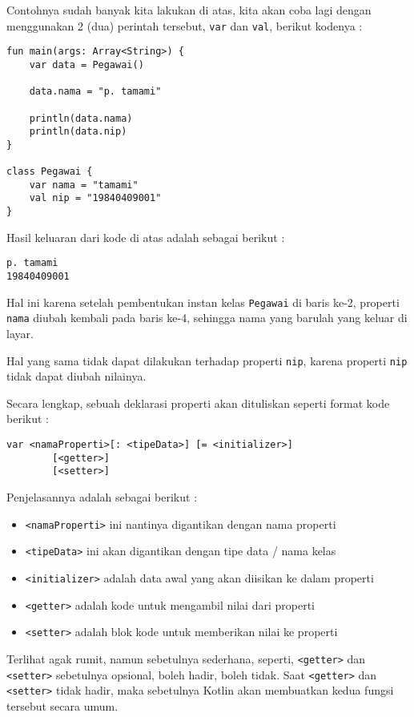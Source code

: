 Contohnya sudah banyak kita lakukan di atas, kita akan coba lagi dengan menggunakan 2 (dua) perintah tersebut, \texttt{var} dan \texttt{val}, berikut kodenya :

\begin{lstlisting}
fun main(args: Array<String>) {
	var data = Pegawai()
	
	data.nama = "p. tamami"
	
	println(data.nama)
	println(data.nip)
}

class Pegawai {
	var nama = "tamami"
	val nip = "19840409001"
}
\end{lstlisting}

Hasil keluaran dari kode di atas adalah sebagai berikut :

\begin{lstlisting}
p. tamami
19840409001
\end{lstlisting}

Hal ini karena setelah pembentukan instan kelas \texttt{Pegawai} di baris ke-2, properti \texttt{nama} diubah kembali pada baris ke-4, sehingga nama yang barulah yang keluar di layar.

Hal yang sama tidak dapat dilakukan terhadap properti \texttt{nip}, karena properti \texttt{nip} tidak dapat diubah nilainya.

Secara lengkap, sebuah deklarasi properti akan dituliskan seperti format kode berikut :

\begin{lstlisting}
var <namaProperti>[: <tipeData>] [= <initializer>]
		[<getter>]
		[<setter>]
\end{lstlisting}

Penjelasannya adalah sebagai berikut :

\begin{itemize}
	\item \texttt{<namaProperti>} ini nantinya digantikan dengan nama properti
	\item \texttt{<tipeData>} ini akan digantikan dengan tipe data / nama kelas
	\item \texttt{<initializer>} adalah data awal yang akan diisikan ke dalam properti
	\item \texttt{<getter>} adalah kode untuk mengambil nilai dari properti
	\item \texttt{<setter>} adalah blok kode untuk memberikan nilai ke properti
\end{itemize}

Terlihat agak rumit, namun sebetulnya sederhana, seperti, \texttt{<getter>} dan \texttt{<setter>} sebetulnya opsional, boleh hadir, boleh tidak. Saat \texttt{<getter>} dan \texttt{<setter>} tidak hadir, maka sebetulnya Kotlin akan membuatkan kedua fungsi tersebut secara umum.

